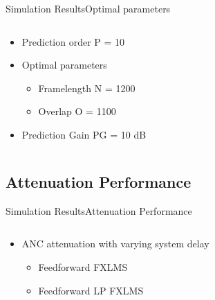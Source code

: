 \begin{frame}{Simulation Results}{Optimal parameters}		
\begin{columns}
	\begin{column}{0.4\textwidth}
	\begin{itemize}
		\item Prediction order P = 10
		\item Optimal parameters
		\begin{itemize}
			\item Framelength N = 1200
			\item Overlap O = 1100
		\end{itemize}
		\item Prediction Gain PG = 10 dB
	\end{itemize}
	\end{column}
	\begin{column}{0.6\textwidth} 
		\resizebox{0.9\columnwidth}{!}{		
			}
	\end{column}
\end{columns}
\end{frame}






\subsection{Attenuation Performance}
\begin{frame}{Simulation Results}{Attenuation Performance}		
\begin{columns}
	\begin{column}{0.4\textwidth}
	\begin{itemize}
		\item ANC attenuation with varying system delay
		\begin{itemize}
			\item Feedforward FXLMS 
			\item Feedforward LP FXLMS 
		\end{itemize}
	\end{itemize}
	\end{column}
	\begin{column}{0.6\textwidth} 
		\resizebox{0.9\columnwidth}{!}{		
			}
	\end{column}
\end{columns}
\end{frame}






